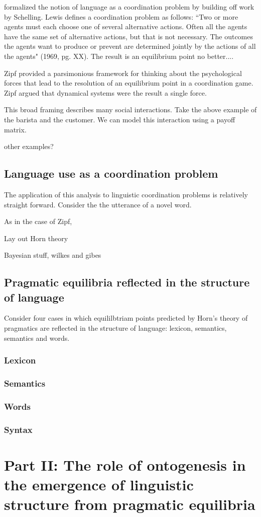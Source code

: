 \documentclass[man, noapacite, 12pt]{apa2}
\begin{document}
 formalized the notion of language as a coordination problem by building off work by Schelling. Lewis defines a coordination problem as follows: ``Two or more agents must each choose one of several alternative actions. Often all the agents have the same set of alternative actions, but that is not necessary. The outcomes the agents want to produce or prevent are determined jointly by the actions of all the agents" (1969, pg. XX). The result is an equilibrium point no better....

Zipf provided a parsimonious framework for thinking about the psychological forces that lead to the resolution of an equilibrium point in a coordination game. Zipf argued that dynamical systems were the result a single force.

This broad framing describes many social interactions. Take the above example of the barista and the customer. We can model this interaction using a payoff matrix. 

other examples? 

\subsection{Language use as a coordination problem}

The application of this analysis to linguistic coordination problems is relatively straight forward. Consider the the utterance of a novel word.

As in the case of Zipf, 

Lay out Horn theory

Bayesian stuff, wilkes and gibes

\subsection{Pragmatic equilibria reflected in the structure of language}
Consider four cases in which equililbtriam points predicted by Horn's theory of pragmatics are reflected in the structure of language: lexicon, semantics, semantics and words.

\subsubsection{Lexicon}
\subsubsection{Semantics}
\subsubsection{Words}
\subsubsection{Syntax}

\section{Part II: The role of ontogenesis in the emergence of linguistic structure from pragmatic equilibria}




\end{document}
